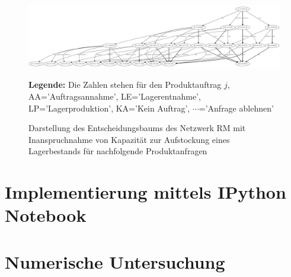 \begin{figure}[h!]
  \begin{center}
    \includegraphics[width=200mm, angle=90]{Bilder/Beispiel8.pdf}
    \caption{Darstellung des Entscheidungsbaums des Netzwerk RM mit Inanspruchnahme von Kapazität zur Aufstockung eines Lagerbestands für nachfolgende Produktanfragen}  \label{B8}
    {\footnotesize \textbf{Legende:} Die Zahlen stehen für den Produktauftrag $j$, AA='Auftragsannahme', LE='Lagerentnahme', LP='Lagerproduktion', KA='Kein Auftrag', $\cdots$='Anfrage ablehnen'} 
  \end{center}
\end{figure}


\section{Implementierung mittels IPython Notebook}

\section{Numerische Untersuchung}